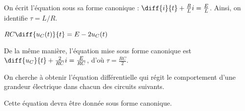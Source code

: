 
\begin{corrige}
On écrit l'équation sous sa forme canonique : $\diff{i}{t} + \frac{R}{L} i = \frac{E}{L}$. Ainsi, on 
identifie $\tau = L/R$.
\end{corrige}




\begin{enonce}
$RC\diff{u_C(t)}{t}  =E- 2u_C(t)$
\end{enonce}


\begin{corrige}
De la même manière, l'équation mise sous forme canonique est $\diff{u_C}{t} + \frac{2}{RC} i = \frac{E}{RC}$, d'où $\tau =\frac{RC}{2}$.
\end{corrige}


\finEntrainement


\newpage




\hauteurLargeurCadreReponse		{10mm}{6.5cm}
\typeEntrainement				{} %
\initialisationEntrainement


On cherche à obtenir l'équation différentielle qui régit le comportement d'une grandeur électrique dans chacun des circuits suivants. 

Cette équation devra être donnée sous forme canonique.

